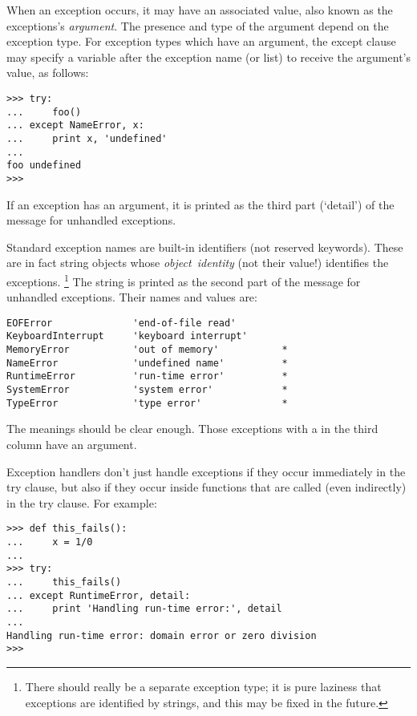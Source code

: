 When an exception occurs, it may have an associated value, also known as
the exceptions's
{\it argument}.
The presence and type of the argument depend on the exception type.
For exception types which have an argument, the except clause may
specify a variable after the exception name (or list) to receive the
argument's value, as follows:
\begin{code}\begin{verbatim}
>>> try:
...     foo()
... except NameError, x:
...     print x, 'undefined'
... 
foo undefined
>>> 
\end{verbatim}\end{code}
If an exception has an argument, it is printed as the third part
(`detail') of the message for unhandled exceptions.

Standard exception names are built-in identifiers (not reserved
keywords).
These are in fact string objects whose
{\it object\ identity}
(not their value!) identifies the exceptions.%
\footnote{
	There should really be a separate exception type; it is pure
	laziness that exceptions are identified by strings, and this may
	be fixed in the future.
}
The string is printed as the second part of the message for unhandled
exceptions.
Their names and values are:
\begin{code}\begin{verbatim}
EOFError              'end-of-file read'
KeyboardInterrupt     'keyboard interrupt'
MemoryError           'out of memory'           *
NameError             'undefined name'          *
RuntimeError          'run-time error'          *
SystemError           'system error'            *
TypeError             'type error'              *
\end{verbatim}\end{code}
The meanings should be clear enough.
Those exceptions with a {\tt *} in the third column have an argument.

Exception handlers don't just handle exceptions if they occur
immediately in the try clause, but also if they occur inside functions
that are called (even indirectly) in the try clause.
For example:
\begin{code}\begin{verbatim}
>>> def this_fails():
...     x = 1/0
... 
>>> try:
...     this_fails()
... except RuntimeError, detail:
...     print 'Handling run-time error:', detail
... 
Handling run-time error: domain error or zero division
>>> 
\end{verbatim}\end{code}

